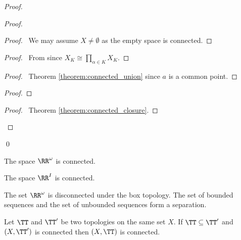\begin{proof}
\begin{proof}
\begin{proof}
            \pf\ We may assume $X \neq \emptyset$ as the empty space is connected.
        \end{proof}
        \begin{proof}
            \pf\ From  since $X_K \cong \prod_{\alpha \in K} X_K$.
        \end{proof}
        \begin{proof}
            \pf\ Theorem \ref{theorem:connected_union} since $a$ is a common point.
        \end{proof}
        \begin{proof}
        \end{proof}
        \begin{proof}
            \pf\ Theorem \ref{theorem:connected_closure}.
        \end{proof}          
    \end{proof}
    \qed
\end{proof}

\begin{corollary}
    The space $\RR^\omega$ is connected.
\end{corollary}

\begin{corollary}
    The space $\RR^I$ is connected.
\end{corollary}

\begin{example}
    The set $\RR^\omega$ is disconnected under the box topology. The set of bounded sequences and the set of unbounded sequences form
    a separation.
\end{example}

\begin{proposition}
    Let $\TT$ and $\TT'$ be two topologies on the same set $X$. If $\TT \subseteq \TT'$ and $(X, \TT')$ is connected then $(X, \TT)$ is connected.
\end{proposition}

